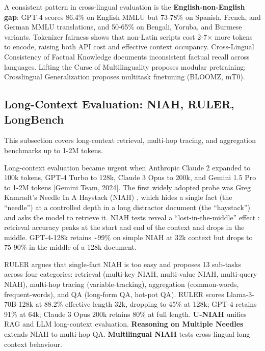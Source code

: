 \documentclass{article}
\begin{document}
A consistent pattern in cross-lingual evaluation is the \textbf{English-non-English gap}: GPT-4 scores 86.4\% on English MMLU but 73-78\% on Spanish, French, and German MMLU translations, and 50-65\% on Bengali, Yoruba, and Burmese variants. Tokenizer fairness \cite{petrov20232023} shows that non-Latin scripts cost 2-7× more tokens to encode, raising both API cost and effective context occupancy. Cross-Lingual Consistency of Factual Knowledge \cite{qi2023crosslingualconsis} documents inconsistent factual recall across languages. Lifting the Curse of Multilinguality \cite{pfeiffer20222022} proposes modular pretraining; Crosslingual Generalization \cite{muennighoff20232023} proposes multitask finetuning (BLOOMZ, mT0).

\subsection{Long-Context Evaluation: NIAH, RULER, LongBench}\label{long-context-evaluation-niah-ruler-longbench}

This subsection covers long-context retrieval, multi-hop tracing, and aggregation benchmarks up to 1-2M tokens.

Long-context evaluation became urgent when Anthropic Claude 2 expanded to 100k tokens, GPT-4 Turbo to 128k, Claude 3 Opus to 200k, and Gemini 1.5 Pro to 1-2M tokens {[}Gemini Team, 2024{]}. The first widely adopted probe was Greg Kamradt's Needle In A Haystack (NIAH) \cite{kamradt2023needleinahaystackp}, which hides a single fact (the ``needle'') at a controlled depth in a long distractor document (the ``haystack'') and asks the model to retrieve it. NIAH tests reveal a ``lost-in-the-middle'' effect \cite{liu2024lostinthemiddlehow}: retrieval accuracy peaks at the start and end of the context and drops in the middle. GPT-4-128k retains \textasciitilde99\% on simple NIAH at 32k context but drops to 75-90\% in the middle of a 128k document.

RULER \cite{hsieh20242024} argues that single-fact NIAH is too easy and proposes 13 sub-tasks across four categories: retrieval (multi-key NIAH, multi-value NIAH, multi-query NIAH), multi-hop tracing (variable-tracking), aggregation (common-words, frequent-words), and QA (long-form QA, hot-pot QA). RULER scores Llama-3-70B-128k at 88.2\% effective length 32k, dropping to 45\% at 128k; GPT-4 retains 91\% at 64k; Claude 3 Opus 200k retains 80\% at full length. \textbf{U-NIAH} \cite{gao20252025} unifies RAG and LLM long-context evaluation. \textbf{Reasoning on Multiple Needles} \cite{wang2025reasoningonmultipl} extends NIAH to multi-hop QA. \textbf{Multilingual NIAH} \cite{hengle20242024} tests cross-lingual long-context behaviour.
\end{document}
